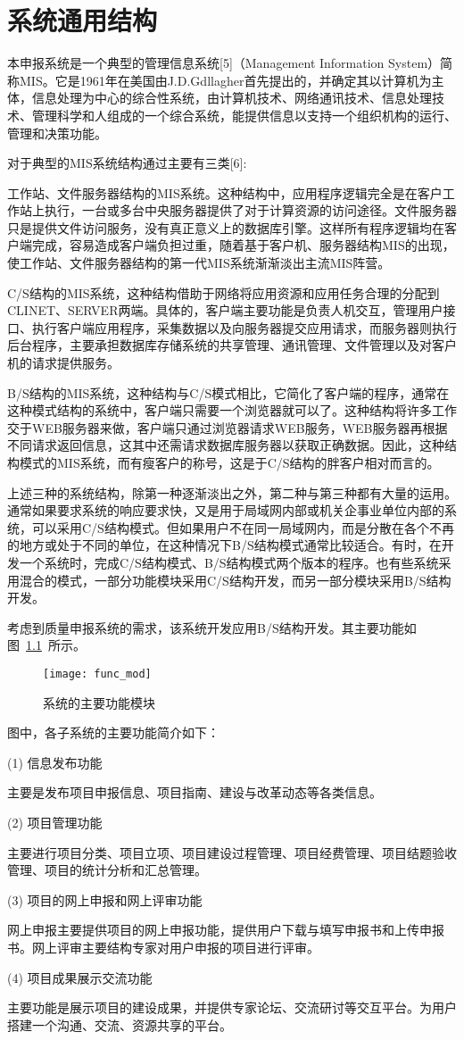 
\chapter{系统通用结构}
本申报系统是一个典型的管理信息系统[5]（Management Information System）简称MIS。它是1961年在美国由J.D.Gdllagher首先提出的，并确定其以计算机为主体，信息处理为中心的综合性系统，由计算机技术、网络通讯技术、信息处理技术、管理科学和人组成的一个综合系统，能提供信息以支持一个组织机构的运行、管理和决策功能。

对于典型的MIS系统结构通过主要有三类[6]:\par
工作站、文件服务器结构的MIS系统。这种结构中，应用程序逻辑完全是在客户工作站上执行，一台或多台中央服务器提供了对于计算资源的访问途径。文件服务器只是提供文件访问服务，没有真正意义上的数据库引擎。这样所有程序逻辑均在客户端完成，容易造成客户端负担过重，随着基于客户机、服务器结构MIS的出现，使工作站、文件服务器结构的第一代MIS系统渐渐淡出主流MIS阵营。

C/S结构的MIS系统，这种结构借助于网络将应用资源和应用任务合理的分配到CLINET、SERVER两端。具体的，客户端主要功能是负责人机交互，管理用户接口、执行客户端应用程序，采集数据以及向服务器提交应用请求，而服务器则执行后台程序，主要承担数据库存储系统的共享管理、通讯管理、文件管理以及对客户机的请求提供服务。

B/S结构的MIS系统，这种结构与C/S模式相比，它简化了客户端的程序，通常在这种模式结构的系统中，客户端只需要一个浏览器就可以了。这种结构将许多工作交于WEB服务器来做，客户端只通过浏览器请求WEB服务，WEB服务器再根据不同请求返回信息，这其中还需请求数据库服务器以获取正确数据。因此，这种结构模式的MIS系统，而有瘦客户的称号，这是于C/S结构的胖客户相对而言的。

上述三种的系统结构，除第一种逐渐淡出之外，第二种与第三种都有大量的运用。通常如果要求系统的响应要求快，又是用于局域网内部或机关企事业单位内部的系统，可以采用C/S结构模式。但如果用户不在同一局域网内，而是分散在各个不再的地方或处于不同的单位，在这种情况下B/S结构模式通常比较适合。有时，在开发一个系统时，完成C/S结构模式、B/S结构模式两个版本的程序。也有些系统采用混合的模式，一部分功能模块采用C/S结构开发，而另一部分模块采用B/S结构开发。

考虑到质量申报系统的需求，该系统开发应用B/S结构开发。其主要功能如图~\ref{fig:func_mod}~所示。
\begin{figure}[htbp]
\centering
\texttt{[image: func\_mod]}
\caption{系统的主要功能模块}\label{fig:func_mod}
\vspace{\baselineskip}
\end{figure}
图中，各子系统的主要功能简介如下：

(1)	信息发布功能\par
主要是发布项目申报信息、项目指南、建设与改革动态等各类信息。

(2)	项目管理功能\par
主要进行项目分类、项目立项、项目建设过程管理、项目经费管理、项目结题验收管理、项目的统计分析和汇总管理。

(3)	项目的网上申报和网上评审功能\par
网上申报主要提供项目的网上申报功能，提供用户下载与填写申报书和上传申报书。网上评审主要结构专家对用户申报的项目进行评审。

(4)	项目成果展示交流功能\par
主要功能是展示项目的建设成果，并提供专家论坛、交流研讨等交互平台。为用户搭建一个沟通、交流、资源共享的平台。
